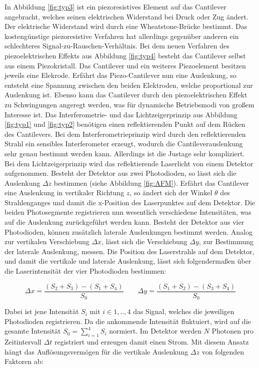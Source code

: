 \noindent
In Abbildung \ref{fig:typ3} ist ein piezoresistives Element auf das Cantilever
angebracht, welches seinen elektrischen Widerstand bei Druck oder Zug ändert.
Der elektrische Widerstand wird durch eine Wheatstone-Brücke bestimmt. Das
kostengünstige piezoresistive Verfahren hat allerdings gegenüber anderen
ein schlechteres Signal-zu-Rauschen-Verhältnis.
Bei dem neuen Verfahren des piezoelektrischen Effekts aus Abbildung \ref{fig:typ4}
besteht das Cantilever selbst aus einem Piezokristall. Das Cantilever und
ein weiteres Piezoelement besitzen jeweils eine Elekrode. Erfährt das Piezo-Cantilever
nun eine Auslenkung, so entsteht eine Spannung zwischen den beiden Elektroden,
welche proportional zur Auslenk{\-}ung ist. Ebenso kann das Cantilever durch den
piezoelektrischen Effekt zu Schwingungen angeregt werden, was für dynamische
Betriebsmodi von großem Interesse ist.
Das Interferometrie- und das Lichtzeigerprinzip aus Abbildung \ref{fig:typ1} und
\ref{fig:typ2} benötigen einen reflektierenden Punkt auf dem Rücken des Cantilevers.
Bei dem Interferometrieprinzip wird durch den reflektierenden Strahl ein sensibles
Interferometer erzeugt, wodurch die Cantileverauslenkung sehr genau bestimmt
werden kann. Allerdings ist die Justage sehr kompliziert.
Bei dem Lichtzeigerprinzip wird das reflektierende Laserlicht von einem Detektor aufgenommen.
Besteht der Detektor aus zwei Photodioden, so lässt sich die Auslenkung $\Delta z$
bestimmen (siehe Abbildung \ref{fig:AFM}). Erfährt das Cantilever eine Auslenkung
in vertikaler Richtung $z$, so ändert sich der Winkel $\theta$ des Strahlenganges
und damit die x-Position des Laserpunktes auf dem Detektor. Die beiden
Photosegmente registrieren nun wesentlich verschiedene Intensitäten, was auf die
Auslenkung zurückgeführt werden kann. Besteht der Detektor aus vier Photodioden,
können zusätzlich laterale Auslenkungen bestimmt werden. Analog zur vertikalen
Verschiebung $\Delta x$, lässt sich die Verschiebung $\Delta y$, zur Bestimmung der
laterale Auslenkung, messen. Die Position des Laserstrahls auf dem Detektor, und
damit die vertikale und laterale Auslenkung, lässt sich folgendermaßen über die
Laserintensität der vier Photodioden bestimmen:

\begin{equation}
  \Delta x = \frac{(S_2 + S_3)-(S_1 + S_4)}{S_0}
  \qquad
  \Delta y = \frac{(S_1 + S_2)-(S_3 + S_4)}{S_0}
  \label{eq:F2}
\end{equation}

\noindent
Dabei ist jene Intensität $S_i$ mit $i \in {1,..,4}$ das Signal, welches die
jeweiligen Photodioden registrieren.
Da die ankommende Intensität fluktuiert, wird auf die gesamte Intensität $S_0 = \sum_{i=1}^4 S_i$
normiert. Im Detektor werden $N$ Photonen pro Zeitintervall $\Delta t$ registriert
und erzeugen damit einen Strom. Mit diesem Ansatz hängt das Auflösungsvermögen
\cite[165]{AFM} für die vertikale Auslenkung $\Delta z$ von folgenden Faktoren ab:

